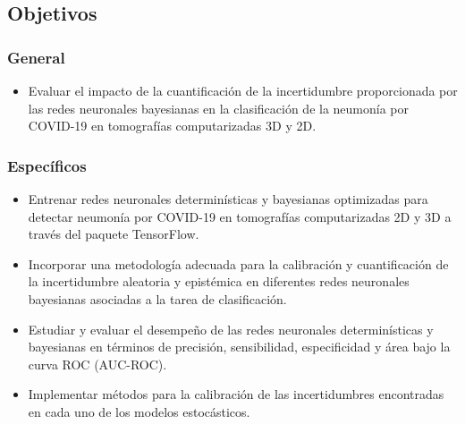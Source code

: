 \documentclass[10pt, oneside, a4paper]{article}
\begin{document}
	
	\subsection{Objetivos}
	
	
	\subsubsection{General}
	\begin{itemize}
		\item Evaluar el impacto de la cuantificación de la incertidumbre proporcionada por las redes neuronales bayesianas en la clasificación de la neumonía por COVID-19 en tomografías computarizadas 3D y 2D.  
		
		
		
	\end{itemize}
	
	\subsubsection{Específicos}
	\begin{itemize}
		
		
		
		\item Entrenar redes neuronales determinísticas y bayesianas optimizadas para detectar neumonía por COVID-19 en tomografías computarizadas 2D y 3D a través del paquete TensorFlow.
		
		\item Incorporar una metodología adecuada para la calibración y cuantificación de la incertidumbre aleatoria y epistémica en diferentes redes neuronales bayesianas asociadas a la tarea de clasificación.%
		
		\item Estudiar y evaluar el desempeño de las redes neuronales determinísticas y bayesianas en términos de precisión, sensibilidad, especificidad y área bajo la curva ROC (AUC-ROC).
		
		\item Implementar métodos para la calibración de las incertidumbres encontradas en cada uno de los modelos estocásticos. 
		
	\end{itemize}
\end{document}
